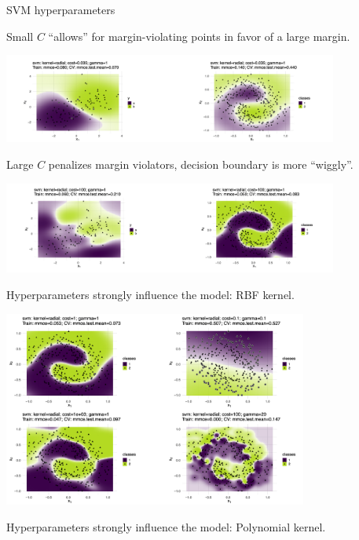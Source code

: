 \begin{vbframe}{SVM hyperparameters}

Small $C$ \enquote{allows} for margin-violating points in favor of a large margin. 


\begin{center}
\includegraphics[width = 11cm ]{figure_man/margin-violating1.png}
\end{center}


Large $C$ penalizes margin violators, decision boundary is more \enquote{wiggly}. 


\begin{center}
\includegraphics[width = 11cm ]{figure_man/margin-violating2.png}
\end{center}


\framebreak

Hyperparameters strongly influence the model: RBF kernel.

\begin{center}
\includegraphics[width = 10cm ]{figure_man/margin-violating_RBF.png}
\end{center}


\framebreak

Hyperparameters strongly influence the model: Polynomial kernel.


\end{vbframe}
